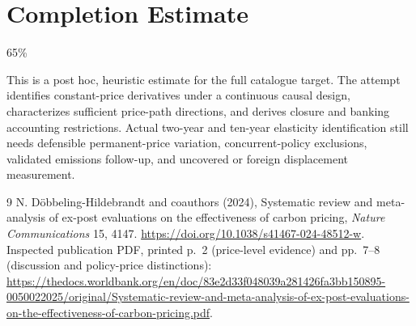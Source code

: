 \documentclass[11pt]{article}
\begin{document}
\section{Completion Estimate}
65\%

This is a post hoc, heuristic estimate for the full catalogue target.
The attempt identifies constant-price derivatives under a continuous causal design, characterizes sufficient price-path directions, and derives closure and banking accounting restrictions. Actual two-year and ten-year elasticity identification still needs defensible permanent-price variation, concurrent-policy exclusions, validated emissions follow-up, and uncovered or foreign displacement measurement.

\begin{thebibliography}{9}
 N. D\"obbeling-Hildebrandt and coauthors (2024), Systematic
review and meta-analysis of ex-post evaluations on the effectiveness of
carbon pricing, \emph{Nature Communications} 15, 4147.
\url{https://doi.org/10.1038/s41467-024-48512-w}.
Inspected publication PDF, printed p.\ 2 (price-level evidence) and
pp.\ 7--8 (discussion and policy-price distinctions):
\url{https://thedocs.worldbank.org/en/doc/83e2d33f048039a281426fa3bb150895-0050022025/original/Systematic-review-and-meta-analysis-of-ex-post-evaluations-on-the-effectiveness-of-carbon-pricing.pdf}.
\end{thebibliography}
\end{document}

